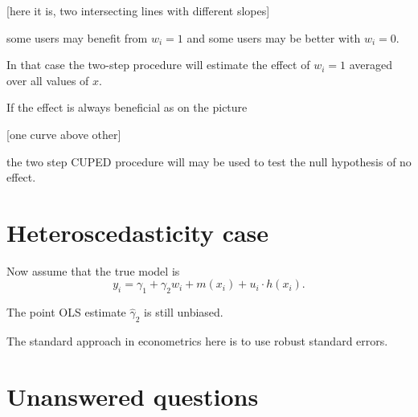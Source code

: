 \documentclass[10pt, a4paper]{article}
\begin{document}
[here it is, two intersecting lines with different slopes]

some users may benefit from $w_i=1$ and some users may be better with $w_i = 0$.

In that case the two-step procedure will estimate the effect of $w_i = 1$ 
averaged over all values of $x$.


If the effect is always beneficial as on the picture 

[one curve above other]

the two step CUPED procedure will may be used to test the null hypothesis of no effect. 

\section{Heteroscedasticity case}

Now assume that the true model is 
\[
    y_i = \gamma_1 + \gamma_2 w_i + m(x_i) + u_i \cdot h(x_i).
\]

The point OLS estimate $\hat\gamma_2$ is still unbiased. 

The standard approach in econometrics here is to use robust standard errors. 




\section{Unanswered questions}
\end{document}
